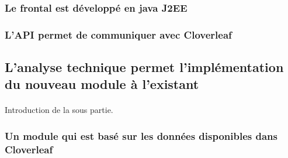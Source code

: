			\paragraph{}%
			
			
		\subsubsection{Le frontal est développé en java J2EE}
			\paragraph{}%
			
			\paragraph{}%
			
		\subsubsection{L'API permet de communiquer avec Cloverleaf}
			\paragraph{}%
	
	\subsection{L'analyse technique permet l'implémentation du nouveau module à l'existant}
		\paragraph{}
		Introduction de la sous partie.
		
		\subsubsection{Un module qui est basé sur les données disponibles dans
		Cloverleaf}
